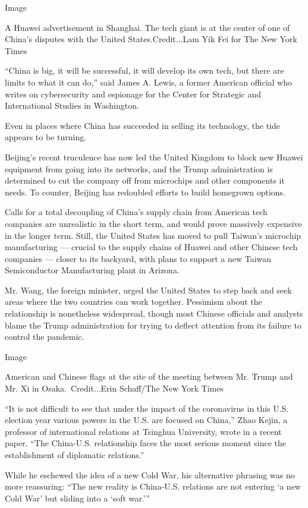 Image

A Huawei advertisement in Shanghai. The tech giant is at the center of
one of China's disputes with the United States.Credit...Lam Yik Fei for
The New York Times

``China is big, it will be successful, it will develop its own tech, but
there are limits to what it can do,'' said James A. Lewis, a former
American official who writes on cybersecurity and espionage for the
Center for Strategic and International Studies in Washington.

Even in places where China has succeeded in selling its technology, the
tide appears to be turning.

Beijing's recent truculence has now led the United Kingdom to block new
Huawei equipment from going into its networks, and the Trump
administration is determined to cut the company off from microchips and
other components it needs. To counter, Beijing has redoubled efforts to
build homegrown options.

Calls for a total decoupling of China's supply chain from American tech
companies are unrealistic in the short term, and would prove massively
expensive in the longer term. Still, the United States has moved to pull
Taiwan's microchip manufacturing --- crucial to the supply chains of
Huawei and other Chinese tech companies --- closer to its backyard, with
plans to support a new Taiwan Semiconductor Manufacturing plant in
Arizona.

Mr. Wang, the foreign minister, urged the United States to step back and
seek areas where the two countries can work together. Pessimism about
the relationship is nonetheless widespread, though most Chinese
officials and analysts blame the Trump administration for trying to
deflect attention from its failure to control the pandemic.

Image

American and Chinese flags at the site of the meeting between Mr. Trump
and Mr. Xi in Osaka.~Credit...Erin Schaff/The New York Times

``It is not difficult to see that under the impact of the coronavirus in
this U.S. election year various powers in the U.S. are focused on
China,'' Zhao Kejin, a professor of international relations at Tsinghua
University, wrote in a recent paper. ``The China-U.S. relationship faces
the most serious moment since the establishment of diplomatic
relations.''

While he eschewed the idea of a new Cold War, his alternative phrasing
was no more reassuring: ``The new reality is China-U.S. relations are
not entering `a new Cold War' but sliding into a `soft war.'''

